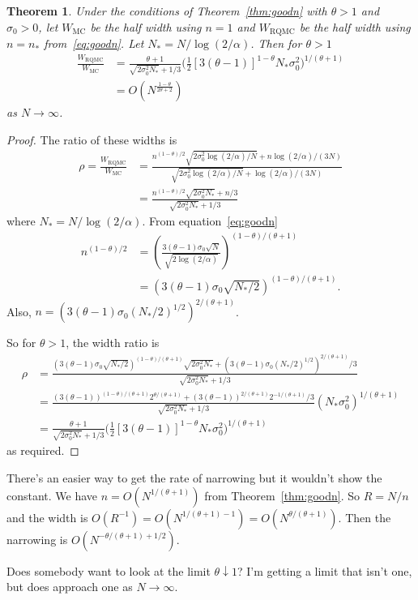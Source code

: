 \documentclass{article}
\newtheorem{theorem}{Theorem}
\newcommand{\art}[1]{\begingroup\color{blue}#1\endgroup}
\newcommand{\mc}{\mathrm{MC}}
\newcommand{\rqmc}{\mathrm{RQMC}}
\begin{document}
\begin{theorem}
Under the conditions of Theorem~\ref{thm:goodn}
with $\theta>1$ and $\sigma_0>0$, 
let $W_{\mc}$ be the half width using $n=1$
and $W_{\rqmc}$ be the half width using
$n=n_*$ from~\eqref{eq:goodn}. 
Let $N_*=N/\log(2/\alpha)$.
Then for $\theta>1$
\begin{align*}
\frac{W_\rqmc}{W_\mc} 
&= 
\frac{\theta+1}
{\sqrt{{2\sigma^2_0N_*}}+1/3}
\biggl(\frac12
[{3(\theta-1)}]^{1-\theta}
N_*\sigma_0^2\biggr)^{1/(\theta+1)}\\
&=O( N^{\frac{1-\theta}{2\theta+2}})
\end{align*}
as $N\to\infty$.
\end{theorem}
\begin{proof}
The ratio of these widths is
\begin{align*}
\rho=
\frac{W_\rqmc}{W_\mc}
&=
\frac{n^{(1-\theta)/2}\sqrt{2\sigma^2_0\log(2/\alpha)/N}+n\log(2/\alpha)/(3N)}
{\sqrt{{2\sigma^2_0\log(2/\alpha)}/N}+\log(2/\alpha)/(3N)}\\
&=
\frac{n^{(1-\theta)/2}\sqrt{2\sigma^2_0N_*}+n/3}
{\sqrt{{2\sigma^2_0N_*}}+1/3}
\end{align*}
where $N_* = N/\log(2/\alpha)$.
From equation~\eqref{eq:goodn}
\begin{align*}
n^{(1-\theta)/2}
&=
\left(\frac{3(\theta-1)\sigma_0
\sqrt{N}}{\sqrt{2\log(2/\alpha)}}\right)^{(1-\theta)/(\theta+1)}\\
&=({3(\theta-1)\sigma_0\sqrt{N_*/2}})^{(1-\theta)/(\theta+1)}.
\end{align*}
Also, $n=(3(\theta-1)\sigma_0(N_*/2)^{1/2})^{2/(\theta+1)}$.

So for $\theta>1$, the width ratio is
\begin{align*}
\rho&=
\frac{({3(\theta-1)\sigma_0\sqrt{N_*/2}})^{(1-\theta)/(\theta+1)}\sqrt{2\sigma^2_0N_*}
+(3(\theta-1)\sigma_0(N_*/2)^{1/2})^{2/(\theta+1)}/3}
{\sqrt{{2\sigma^2_0N_*}}+1/3}\\
&=\frac{({3(\theta-1)})^{(1-\theta)/(\theta+1)}2^{\theta/(\theta+1)}
+(3(\theta-1))^{2/(\theta+1)}2^{-1/(\theta+1)}/3}
{\sqrt{{2\sigma^2_0N_*}}+1/3}(N_*\sigma_0^2)^{1/(\theta+1)}\\
&=\frac{\theta+1}
{\sqrt{{2\sigma^2_0N_*}}+1/3}
\biggl(\frac12
[{3(\theta-1)}]^{1-\theta}
N_*\sigma_0^2\biggr)^{1/(\theta+1)}
\end{align*}
as required.
\end{proof}
\art{There's an easier way to get the rate
of narrowing but it
wouldn't show the constant. We have $n=O(N^{1/(\theta+1)})$
from Theorem~\ref{thm:goodn}. So $R=N/n$ and the width
is $O(R^{-1})=O(N^{1/(\theta+1)-1})=O(N^{\theta/(\theta+1)})$.
Then the narrowing is $O(N^{-\theta/(\theta+1)+1/2})$.

Does somebody want to look at the limit $\theta\downarrow1$?
I'm getting a limit that isn't one, but does approach one
as $N\to\infty$.
}
\end{document}
